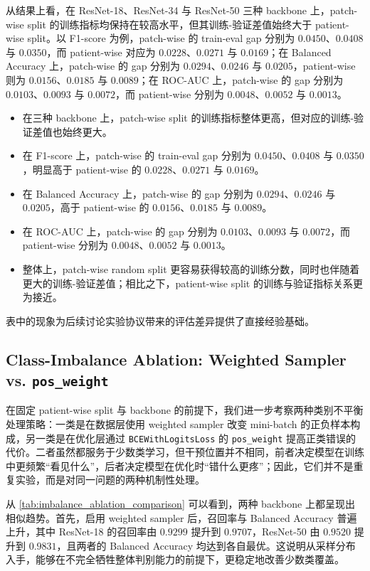 从结果上看，在 ResNet-18、ResNet-34 与 ResNet-50 三种 backbone 上，patch-wise split 的训练指标均保持在较高水平，但其训练-验证差值始终大于 patient-wise split。以 F1-score 为例，patch-wise 的 train-eval gap 分别为 $0.0450$、$0.0408$ 与 $0.0350$，而 patient-wise 对应为 $0.0228$、$0.0271$ 与 $0.0169$；在 Balanced Accuracy 上，patch-wise 的 gap 分别为 $0.0294$、$0.0246$ 与 $0.0205$，patient-wise 则为 $0.0156$、$0.0185$ 与 $0.0089$；在 ROC-AUC 上，patch-wise 的 gap 分别为 $0.0103$、$0.0093$ 与 $0.0072$，而 patient-wise 分别为 $0.0048$、$0.0052$ 与 $0.0013$。
\begin{itemize}
    \item 在三种 backbone 上，patch-wise split 的训练指标整体更高，但对应的训练-验证差值也始终更大。
    \item 在 F1-score 上，patch-wise 的 train-eval gap 分别为 $0.0450$、$0.0408$ 与 $0.0350$，明显高于 patient-wise 的 $0.0228$、$0.0271$ 与 $0.0169$。
    \item 在 Balanced Accuracy 上，patch-wise 的 gap 分别为 $0.0294$、$0.0246$ 与 $0.0205$，高于 patient-wise 的 $0.0156$、$0.0185$ 与 $0.0089$。
    \item 在 ROC-AUC 上，patch-wise 的 gap 分别为 $0.0103$、$0.0093$ 与 $0.0072$，而 patient-wise 分别为 $0.0048$、$0.0052$ 与 $0.0013$。
    \item 整体上，patch-wise random split 更容易获得较高的训练分数，同时也伴随着更大的训练-验证差值；相比之下，patient-wise split 的训练与验证指标关系更为接近。
\end{itemize}

表中的现象为后续讨论实验协议带来的评估差异提供了直接经验基础。

\subsection{Class-Imbalance Ablation: Weighted Sampler vs. \texttt{pos\_weight}}

在固定 patient-wise split 与 backbone 的前提下，我们进一步考察两种类别不平衡处理策略：一类是在数据层使用 weighted sampler 改变 mini-batch 的正负样本构成，另一类是在优化层通过 \texttt{BCEWithLogitsLoss} 的 \texttt{pos\_weight} 提高正类错误的代价。二者虽然都服务于少数类学习，但干预位置并不相同，前者决定模型在训练中更频繁“看见什么”，后者决定模型在优化时“错什么更疼”；因此，它们并不是重复实验，而是对同一问题的两种机制性处理。



从 \cref{tab:imbalance_ablation_comparison} 可以看到，两种 backbone 上都呈现出相似趋势。首先，启用 weighted sampler 后，召回率与 Balanced Accuracy 普遍上升，其中 ResNet-18 的召回率由 $0.9299$ 提升到 $0.9707$，ResNet-50 由 $0.9520$ 提升到 $0.9831$，且两者的 Balanced Accuracy 均达到各自最优。这说明从采样分布入手，能够在不完全牺牲整体判别能力的前提下，更稳定地改善少数类覆盖。

